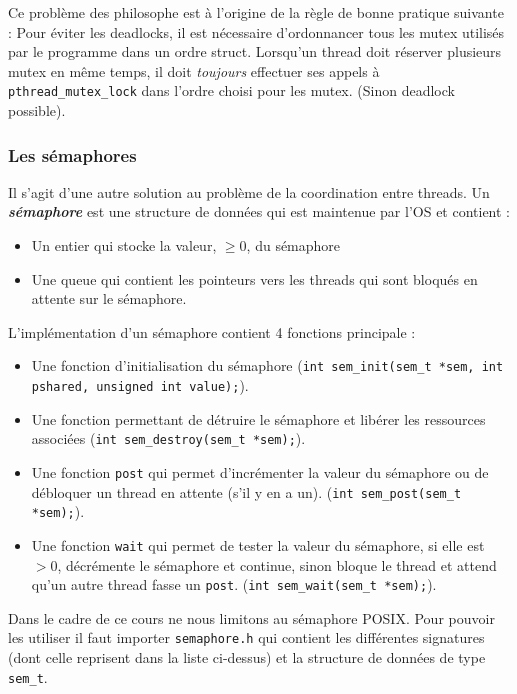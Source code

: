 Ce problème des philosophe est à l'origine de la règle de bonne pratique suivante : Pour éviter les deadlocks, il est nécessaire d'ordonnancer tous les mutex utilisés par le programme dans un ordre struct.
Lorsqu'un thread doit réserver plusieurs  mutex en même temps, il doit \textit{toujours} effectuer ses appels à \texttt{pthread\_mutex\_lock} dans l'ordre choisi pour les mutex.
(Sinon deadlock possible).

\subsubsection{Les sémaphores}
Il s'agit d'une autre solution au problème de la coordination entre threads.
Un \textbf{\textit{sémaphore}} est une structure de données qui est maintenue par l'OS et contient :
\begin{itemize}
  \item Un entier qui stocke la valeur, $\geq 0$, du sémaphore
  \item Une queue qui contient les pointeurs vers les threads qui sont bloqués en attente sur le sémaphore.
\end{itemize}

L'implémentation d'un sémaphore contient 4 fonctions principale :
\begin{itemize}
  \item Une fonction d'initialisation du sémaphore (\texttt{int sem\_init(sem\_t *sem, int pshared, unsigned int value);}).
  \item Une fonction permettant de détruire le sémaphore et libérer les ressources associées (\texttt{int sem\_destroy(sem\_t *sem);}).
  \item Une fonction \texttt{post} qui permet d'incrémenter la valeur du sémaphore ou de débloquer un thread en attente (s'il y en a un).
    (\texttt{int sem\_post(sem\_t *sem);}).
  \item Une fonction \texttt{wait} qui permet de tester la valeur du sémaphore, si elle est $>0$, décrémente le sémaphore et continue, sinon bloque le thread et attend qu'un autre thread fasse un \texttt{post}.
    (\texttt{int sem\_wait(sem\_t *sem);}).
\end{itemize}

Dans le cadre de ce cours ne nous limitons au sémaphore POSIX.
Pour pouvoir les utiliser il faut importer \texttt{semaphore.h} qui contient les différentes signatures (dont celle reprisent dans la liste ci-dessus) et la structure de données de type \texttt{sem\_t}.


